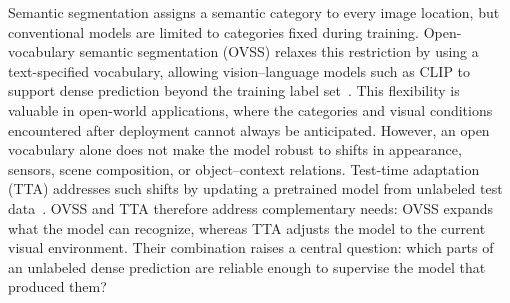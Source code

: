\documentclass[letterpaper]{article}
\newcommand{\method}{TRACE\xspace}
\begin{document}
		
		
	
	
	Semantic segmentation assigns a semantic category to every image location, but conventional models are limited to categories fixed during training. Open-vocabulary semantic segmentation (OVSS) relaxes this restriction by using a text-specified vocabulary, allowing vision--language models such as CLIP to support dense prediction beyond the training label set~\cite{radford2021clip,ghiasi2022openseg,liang2023ovseg,cho2024catseg}. This flexibility is valuable in open-world applications, where the categories and visual conditions encountered after deployment cannot always be anticipated. However, an open vocabulary alone does not make the model robust to shifts in appearance, sensors, scene composition, or object--context relations. Test-time adaptation (TTA) addresses such shifts by updating a pretrained model from unlabeled test data~\cite{wang2021tent,wang2022cotta,niu2022eata}. OVSS and TTA therefore address complementary needs: OVSS expands what the model can recognize, whereas TTA adjusts the model to the current visual environment. Their combination raises a central question: which parts of an unlabeled dense prediction are reliable enough to supervise the model that produced them?
	
\end{document}
